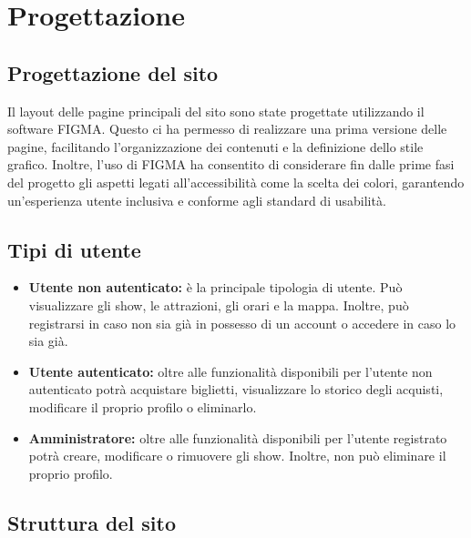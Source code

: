 \section{Progettazione}

\subsection{Progettazione del sito}
Il layout delle pagine principali del sito sono state progettate utilizzando il software FIGMA. Questo ci ha permesso di realizzare una prima versione delle pagine, facilitando l'organizzazione dei contenuti e la definizione dello stile grafico. Inoltre, l'uso di FIGMA ha consentito di considerare fin dalle prime fasi del progetto gli aspetti legati all'accessibilità come la scelta dei colori, garantendo un'esperienza utente inclusiva e conforme agli standard di usabilità.

\subsection{Tipi di utente}
\begin{itemize}
    \item \textbf{Utente non autenticato:} è la principale tipologia di utente. Può visualizzare gli show, le attrazioni, gli orari e la mappa. Inoltre, può registrarsi in caso non sia già in possesso di un account o accedere in caso lo sia già.
    \item \textbf{Utente autenticato:} oltre alle funzionalità disponibili per l'utente non autenticato potrà acquistare biglietti, visualizzare lo storico degli acquisti, modificare il proprio profilo o eliminarlo.
    \item \textbf{Amministratore:} oltre alle funzionalità disponibili per l'utente registrato potrà creare, modificare o rimuovere gli show. Inoltre, non può eliminare il proprio profilo.
\end{itemize}

\subsection{Struttura del sito}
